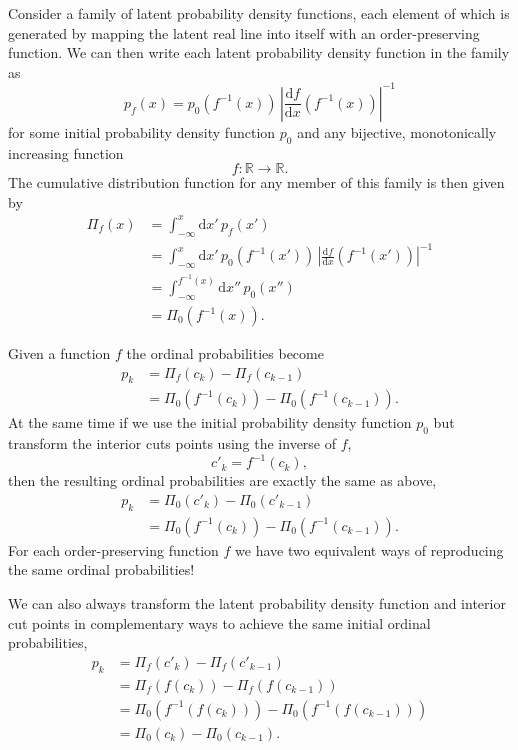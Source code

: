 \documentclass[
  letterpaper,
  DIV=11,
  numbers=noendperiod]{scrartcl}
\begin{document}
Consider a family of latent probability density functions, each element
of which is generated by mapping the latent real line into itself with
an order-preserving function. We can then write each latent probability
density function in the family as \[
p_{f}(x) = p_{0} \left( f^{-1}(x) \right) \,
\left| \frac{ \mathrm{d} f }{ \mathrm{d} x}
       \left( f^{-1}(x) \right) \right|^{-1}
\] for some initial probability density function \(p_{0}\) and any
bijective, monotonically increasing function \[
f : \mathbb{R} \rightarrow \mathbb{R}.
\] The cumulative distribution function for any member of this family is
then given by \begin{align*}
\Pi_{f}(x)
&=
\int_{-\infty}^{x} \mathrm{d} x' \, p_{f}(x')
\\
&=
\int_{-\infty}^{x} \mathrm{d} x' \,
p_{0} \left( f^{-1}(x') \right) \,
\left| \frac{ \mathrm{d} f }{ \mathrm{d} x}
       \left( f^{-1}(x') \right) \right|^{-1}
\\
&=
\int_{-\infty}^{f^{-1}(x)} \mathrm{d} x'' \, p_{0} \left( x'' \right)
\\
&=
\Pi_{0} \left( f^{-1}(x) \right).
\end{align*}

Given a function \(f\) the ordinal probabilities become \begin{align*}
p_{k}
&=
\Pi_{f}(c_{k}) - \Pi_{f}(c_{k - 1})
\\
&=
  \Pi_{0} \left( f^{-1}(c_{k}    ) \right)
- \Pi_{0} \left( f^{-1}(c_{k - 1}) \right).
\end{align*} At the same time if we use the initial probability density
function \(p_{0}\) but transform the interior cuts points using the
inverse of \(f\), \[
c'_{k} = f^{-1}(c_{k}),
\] then the resulting ordinal probabilities are exactly the same as
above, \begin{align*}
p_{k}
&=
  \Pi_{0} \left( c'_{k}     \right)
- \Pi_{0} \left( c'_{k - 1} \right)
\\
&=
  \Pi_{0} \left( f^{-1}(c_{k}    ) \right)
- \Pi_{0} \left( f^{-1}(c_{k - 1}) \right).
\end{align*} For each order-preserving function \(f\) we have two
equivalent ways of reproducing the same ordinal probabilities!

We can also always transform the latent probability density function and
interior cut points in complementary ways to achieve the same initial
ordinal probabilities, \begin{align*}
p_{k}
&=
  \Pi_{f} \left( c'_{k}     \right)
- \Pi_{f} \left( c'_{k - 1} \right)
\\
&=
  \Pi_{f} \left( f(c_{k}     ) \right)
- \Pi_{f} \left( f(c_{k - 1} ) \right)
\\
&=
  \Pi_{0} \left( f^{-1}(f(c_{k}    )) \right)
- \Pi_{0} \left( f^{-1}(f(c_{k - 1})) \right)
\\
&=
  \Pi_{0} ( c_{k}     )
- \Pi_{0} ( c_{k - 1} ).
\end{align*}
\end{document}
